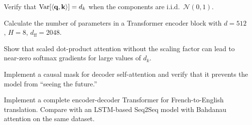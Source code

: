 \begin{exercise}[$\star$]
Verify that $\text{Var}[\langle \mathbf{q}, \mathbf{k} \rangle] = d_k$ when the
components are i.i.d.\ $\mathcal{N}(0, 1)$.
\end{exercise}

\begin{exercise}[$\star$]
Calculate the number of parameters in a Transformer encoder block with
$d = 512$, $H = 8$, $d_{\text{ff}} = 2048$.
\end{exercise}

\begin{exercise}[$\star\star$]
Show that scaled dot-product attention without the scaling factor can lead to
near-zero softmax gradients for large values of $d_k$.
\end{exercise}

\begin{exercise}[$\star\star$]
Implement a causal mask for decoder self-attention and verify that it prevents
the model from ``seeing the future.''
\end{exercise}

\begin{exercise}[$\star\star\star$]
Implement a complete encoder-decoder Transformer for French-to-English
translation. Compare with an LSTM-based Seq2Seq model with Bahdanau attention
on the same dataset.
\end{exercise}
